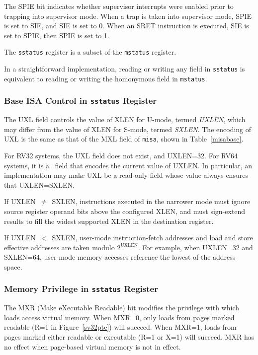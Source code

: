 The SPIE bit indicates whether supervisor interrupts were enabled prior to
trapping into supervisor mode.  When a trap is taken into supervisor
mode, SPIE is set to SIE, and SIE is set to 0.  When an SRET instruction is
executed, SIE is set to SPIE, then SPIE is set to 1.

The {\tt sstatus} register is a subset of the {\tt mstatus} register.

\begin{commentary}
In a straightforward implementation, reading or writing any field in
{\tt sstatus} is equivalent to reading or writing the homonymous field
in {\tt mstatus}.
\end{commentary}

\subsubsection{Base ISA Control in {\tt sstatus} Register}

The UXL field controls the value of XLEN for U-mode, termed {\em UXLEN},
which may differ from the value of XLEN for S-mode, termed {\em SXLEN}.  The
encoding of UXL is the same as that of the MXL field of {\tt misa}, shown in
Table~\ref{misabase}.

For RV32 systems, the UXL field does not exist, and UXLEN=32.  For RV64
systems, it is a \warl\ field that encodes the current value of UXLEN.
In particular, an implementation may make UXL be a read-only field whose
value always ensures that UXLEN=SXLEN.

If UXLEN~$\ne$~SXLEN, instructions executed in the narrower mode must ignore
source register operand bits above the configured XLEN, and must sign-extend
results to fill the widest supported XLEN in the destination register.

If UXLEN~$<$~SXLEN, user-mode instruction-fetch addresses and load and store
effective addresses are taken modulo $2^{\text{UXLEN}}$.  For example, when UXLEN=32
and SXLEN=64, user-mode memory accesses reference the lowest 
of the address space.

\subsubsection{Memory Privilege in {\tt sstatus} Register}
\label{sec:sum}

The MXR (Make eXecutable Readable) bit modifies the privilege with which loads
access virtual memory.  When MXR=0, only loads from pages marked readable (R=1
in Figure~\ref{sv32pte}) will succeed.  When MXR=1, loads from pages marked
either readable or executable (R=1 or X=1) will succeed.  MXR has no effect
when page-based virtual memory is not in effect.


